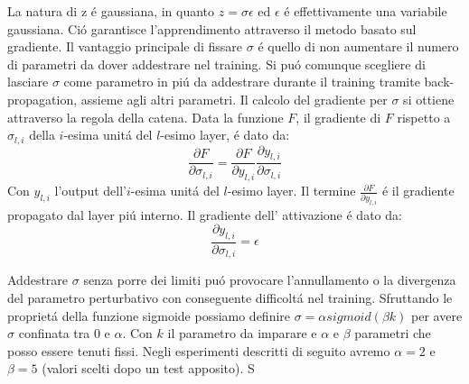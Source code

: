\documentclass[a4paper,10pt]{article}
\begin{document}
 La natura di z \'e gaussiana, in quanto $z = \sigma \epsilon$ ed $\epsilon$ \'e effettivamente una variabile gaussiana. Ci\'o garantisce l'apprendimento attraverso il metodo basato sul gradiente. Il vantaggio principale di fissare $\sigma$ \'e quello di non aumentare il numero di parametri da dover addestrare nel training. 
 Si pu\'o comunque scegliere di lasciare $\sigma$ come parametro in pi\'u da addestrare durante il training tramite back-propagation, assieme agli altri parametri. Il calcolo del gradiente per $\sigma$ si ottiene attraverso la regola della catena. Data la funzione $F$, il gradiente di $F$ rispetto a $\sigma_{l, i}$ della $i$-esima unit\'a del $l$-esimo layer, \'e dato da:
 \begin{equation} 
  \frac{\partial F}{\partial\sigma_{l, i}} =  \frac{\partial F}{\partial y_{l, i}} \frac{\partial y_{l, i}}{\partial\sigma_{l, i}}
 \end{equation} 
 Con $y_{l, i}$ l'output dell'$i$-esima unit\'a del $l$-esimo layer. Il termine $\frac{\partial F}{\partial y_{l, i}}$ \'e il gradiente propagato dal layer pi\'u interno. Il gradiente dell' attivazione \'e dato da:
 \begin{equation} 
  \frac{\partial y_{l, i}}{\partial\sigma_{l, i}} = \epsilon
 \end{equation} 

 \begin{teorema} 
  Addestrare $\sigma$ senza porre dei limiti pu\'o provocare l'annullamento o la divergenza del parametro perturbativo con conseguente difficolt\'a nel training. Sfruttando le propriet\'a della funzione sigmoide possiamo definire $\sigma = \alpha sigmoid(\beta k)$ per avere $\sigma$ confinata tra $0$ e $\alpha$. Con $k$ il parametro da imparare e $\alpha$ e $\beta$ parametri che posso essere tenuti fissi. Negli esperimenti descritti di seguito avremo $\alpha = 2$ e $\beta = 5$ (valori scelti dopo un test apposito). S
 \end{teorema}
\end{document}
